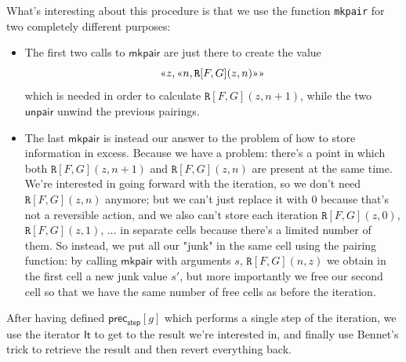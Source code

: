 \documentclass{book}
\theoremstyle{definition}
\theoremstyle{remark}
\theoremstyle{plain}
\newcommand{\gl}{\text{\guillemotleft}}
\newcommand{\gr}{\text{\guillemotright}}
\newcommand{\rppIt}{\mathsf{It}}
\newcommand{\rppmkpair}{\mathsf{mkpair}}
\newcommand{\rppunpair}{\mathsf{unpair}}
\newcommand{\rppprecstep}{\mathsf{prec_{step}}}
\newcommand{\prPrec}{\mathtt{R}}
\begin{document}
What's interesting about this procedure is that we use the function \lstinline{mkpair} for
two completely different purposes:
\begin{itemize}
\item The first two calls to $\rppmkpair$ are just there to create the value
\[ \gl z, \gl n, \prPrec[F,G](z,n) \gr \gr \]
which is needed in order to calculate $\prPrec[F,G](z,n+1)$, while the two $\rppunpair$ unwind the previous pairings.
\item The last $\rppmkpair$ is instead our answer to the problem of how to store information in excess.
Because we have a problem: there's a point in which both $\prPrec[F,G](z,n+1)$ and $\prPrec[F,G](z,n)$ are present at the same time.
We're interested in going forward with the iteration, so we don't need $\prPrec[F,G](z,n)$ anymore;
but we can't just replace it with $0$ because that's not a reversible action,
and we also can't store each iteration $\prPrec[F,G](z,0)$, $\prPrec[F,G](z,1)$, $\dots$ in
separate cells because there's a limited number of them.
So instead, we put all our "junk" in the same cell using the pairing function:
by calling $\rppmkpair$ with arguments $s$, $\prPrec[F,G](n,z)$ we obtain in the first cell a new junk value $s'$, but more importantly
we free our second cell so that we have the same number of free cells as before the iteration.
\end{itemize}

After having defined $\rppprecstep[g]$ which performs a single step of the iteration,
we use the iterator $\rppIt$ to get to the result we're interested in,
and finally use Bennet's trick to retrieve the result and then revert everything back.
\end{document}
